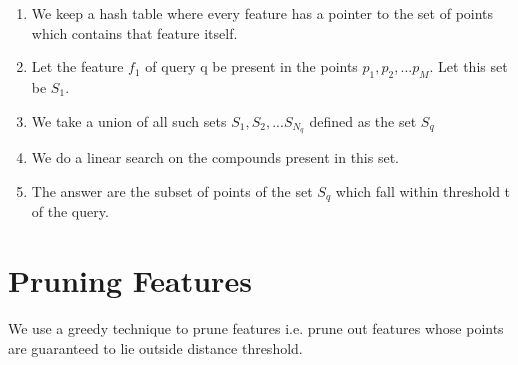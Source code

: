 \begin{enumerate}
	\item We keep a hash table where every feature has a pointer to the set of points which contains that feature itself.
	\item Let the feature $f_1$ of query q be present in the points $p_1,p_2,...p_M$. Let this set be $S_1$.
	\item We take a union of all such sets $S_1, S_2,...S_{N_q}$ defined as the set $S_q$
	\item We do a linear search on the compounds present in this set.
	\item The answer are the subset of points of the set $S_q$ which fall within threshold t of the query.	 
\end{enumerate}


\section{Pruning Features}
 We use a greedy technique to prune features i.e. prune out features whose points are guaranteed to lie outside distance threshold.
 
